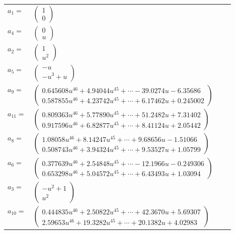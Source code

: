 \documentclass[1p]{elsarticle_modified}
\theoremstyle{definition}
\begin{document}
\begin{tabular}{m{7pt} m{180pt} m{7pt} m{180pt} }
\flushright $a_{1}=$&$\begin{pmatrix}1\\0\end{pmatrix}$ \\
\flushright $a_{4}=$&$\begin{pmatrix}0\\u\end{pmatrix}$ \\
\flushright $a_{2}=$&$\begin{pmatrix}1\\u^2\end{pmatrix}$ \\
\flushright $a_{5}=$&$\begin{pmatrix}- u\\- u^3+u\end{pmatrix}$ \\
\flushright $a_{9}=$&$\begin{pmatrix}0.645608 u^{46}+4.94044 u^{45}+\cdots-39.0274 u-6.35686\\0.587855 u^{46}+4.23742 u^{45}+\cdots+6.17462 u+0.245002\end{pmatrix}$ \\
\flushright $a_{11}=$&$\begin{pmatrix}0.809363 u^{46}+5.77890 u^{45}+\cdots+51.2482 u+7.31402\\0.917596 u^{46}+6.82877 u^{45}+\cdots+8.41124 u+2.05442\end{pmatrix}$ \\
\flushright $a_{8}=$&$\begin{pmatrix}1.08058 u^{46}+8.14247 u^{45}+\cdots+9.68656 u-1.51066\\0.508743 u^{46}+3.94324 u^{45}+\cdots+9.53527 u+1.05799\end{pmatrix}$ \\
\flushright $a_{6}=$&$\begin{pmatrix}0.377639 u^{46}+2.54848 u^{45}+\cdots-12.1966 u-0.249306\\0.653298 u^{46}+5.04572 u^{45}+\cdots+6.43493 u+1.03094\end{pmatrix}$ \\
\flushright $a_{3}=$&$\begin{pmatrix}- u^2+1\\u^2\end{pmatrix}$ \\
\flushright $a_{10}=$&$\begin{pmatrix}0.444835 u^{46}+2.50822 u^{45}+\cdots+42.3670 u+5.69307\\2.59653 u^{46}+19.3282 u^{45}+\cdots+20.1382 u+4.02983\end{pmatrix}$ \\

\end{tabular}
\end{document}
